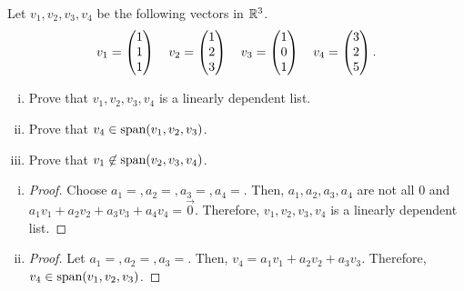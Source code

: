 \begin{question}\label{que:LinDepInR3}
    \normalfont


    Let $v_1, v_2, v_3, v_4$ be the following vectors in ${\mathbb R}^3$.
    \begin{align*}
        v_1 = \begin{pmatrix} 1\\ 1\\ 1\end{pmatrix}\ \ \
        v_2 = \begin{pmatrix} 1\\ 2\\ 3\end{pmatrix}\ \ \
        v_3 = \begin{pmatrix} 1\\ 0\\ 1\end{pmatrix}\ \ \
        v_4 = \begin{pmatrix} 3\\ 2\\ 5\end{pmatrix}.
    \end{align*}


    \begin{enumerate}[(i)]
        \item Prove that $v_1, v_2, v_3, v_4$ \hspace{.1cm} is a linearly dependent list.
        \item Prove that $v_4\in\textnormal{span}(v_1,v_2,v_3)$.
        \item Prove that $v_1\not\in\textnormal{span}(v_2, v_3, v_4)$.
    \end{enumerate}
\end{question}

\begin{enumerate}[(i)]
    \item\begin{proof}
        Choose $a_1=, a_2=, a_3=, a_4=$. Then, $a_1,a_2,a_3,a_4$ are not all 0 and $a_1v_1+a_2v_2+a_3v_3+a_4v_4=\vec{0}$. Therefore, $v_1,v_2,v_3,v_4$ is a linearly dependent list.
    \end{proof}
    \item\begin{proof}
        Let $a_1=, a_2=, a_3=$. Then, $v_4=a_1v_1+a_2v_2+a_3v_3$. Therefore, $v_4\in\textnormal{span}(v_1,v_2,v_3)$.
    \end{proof}
\end{enumerate}
